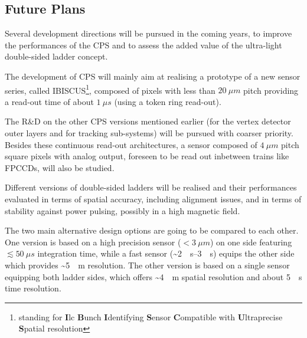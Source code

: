 \subsection{Future Plans}
Several development directions will be pursued in the coming years,
to improve the performances of the CPS and to assess the added value
of the ultra-light double-sided ladder concept.

The development of CPS will mainly aim at realising a prototype of
a new sensor series, called IBISCUS\footnote{standing for {\bf I}lc
{\bf B}unch {\bf I}dentifying {\bf S}ensor {\bf C}ompatible with
{\bf U}ltraprecise {\bf S}patial resolution},
composed of pixels with less than $\SI{20}{\mu m}$ pitch providing a
read-out time of about $\SI{1}{\mu s}$ (using a token ring read-out).

The R\&D on the other CPS versions mentioned earlier (for the vertex
detector outer layers and for tracking sub-systems) will be pursued
with coarser priority.
Besides these continuous read-out architectures, a sensor composed
of $\SI{4}{\mu m}$ pitch square pixels with analog output, foreseen to be
read out inbetween trains like FPCCDs, will also be studied.


Different versions of double-sided ladders will be realised and
their performances evaluated in terms of spatial accuracy, including
alignment issues, and in terms of stability against power pulsing,
possibly in a high magnetic field.

The two main alternative design options are going to be compared
to each other. One version is based on a high precision sensor
($<\SI{3}{\mu m}$) on one side featuring $\lesssim\SI{50}{\mu s}$ integration
time, while a fast sensor (\sim\SIrange{2}{3}{\mu s}) equips the other side
which provides \sim\SI{5}{\mu m} resolution. The other version is based
on a single sensor equipping both ladder sides, which offers \sim\SI{4}{\mu m}
spatial resolution and about \SI{5}{\mu s} time resolution.
